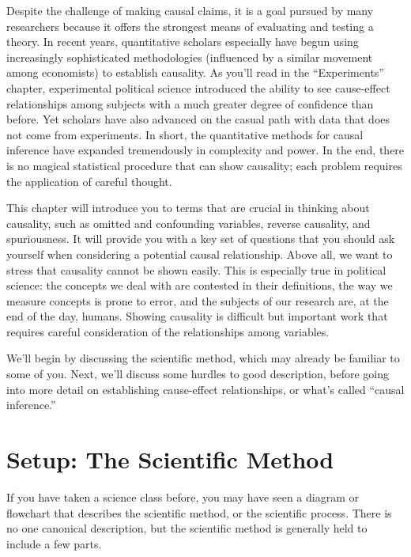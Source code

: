 \documentclass{book}
\begin{document}
Despite the challenge of making causal claims, it is a goal pursued by many
researchers because it offers the strongest means of evaluating and testing a
theory. In recent years, quantitative scholars especially have begun using
increasingly sophisticated methodologies (influenced by a similar movement
among economists) to establish causality. As you'll read in the
``Experiments'' chapter, experimental political science introduced the ability
to see cause-effect relationships among subjects with a much greater degree of
confidence than before. Yet scholars have also advanced on the casual path
with data that does not come from experiments. In short, the quantitative
methods for causal inference have expanded tremendously in complexity and
power. In the end, there is no magical statistical procedure that can show
causality; each problem requires the application of careful thought.

This chapter will introduce you to terms that are crucial in thinking about
causality, such as omitted and confounding variables, reverse causality, and
spuriousness. It will provide you with a key set of questions that you should
ask yourself when considering a potential causal relationship. Above all, we
want to stress that causality cannot be shown easily. This is especially true
in political science: the concepts we deal with are contested in their
definitions, the way we measure concepts is prone to error, and the subjects
of our research are, at the end of the day, humans. Showing causality is
difficult but important work that requires careful consideration of the
relationships among variables.

We'll begin by discussing the scientific method, which may already be familiar
to some of you. Next, we'll discuss some hurdles to good description, before
going into more detail on establishing cause-effect relationships, or what's
called ``causal inference.''

\hypertarget{setup-the-scientific-method}{%
\section{Setup: The Scientific Method}\label{setup-the-scientific-method}}

If you have taken a science class before, you may have seen a diagram or
flowchart that describes the scientific method, or the scientific process.
There is no one canonical description, but the scientific method is generally
held to include a few parts.
\end{document}
